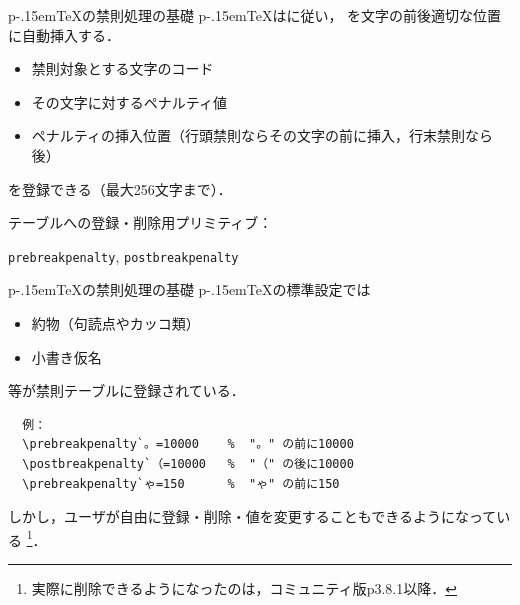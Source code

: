 \documentclass[a5paper,dvipdfmx,14pt]{beamer}
\def\cs#1{\texttt{\char92\nobreak#1}}
\def\pTeX{p\kern-.15em\TeX}
\begin{document}
\begin{frame}{\pTeX の禁則処理の基礎}
\pTeX はに従い，
を文字の前後適切な位置に自動挿入する．
\begin{tcolorbox}[colframe=black!70!green,colback=white!90!blue!90!green,
  coltitle=white,fonttitle=\small\bfseries,
  title=禁則テーブル(KINSOKU table)]\small
\begin{itemize}\small\leftskip-5pt\baselineskip0pt
  \item 禁則対象とする文字のコード
  \item その文字に対するペナルティ値
  \item ペナルティの挿入位置（行頭禁則ならその文字の前に挿入，行末禁則なら後）
\end{itemize}
を登録できる（最大256文字まで）．
\end{tcolorbox}
\pause
テーブルへの登録・削除用プリミティブ：
\begin{center}
  \cs{prebreak{\color{red}penalty}}, \cs{postbreak{\color{red}penalty}}
\end{center}
\end{frame}

\begin{frame}[fragile]{\pTeX の禁則処理の基礎}
\pTeX の標準設定では
\begin{itemize}\small
\item 約物（句読点やカッコ類）
\item 小書き仮名
\end{itemize}
等が禁則テーブルに登録されている．
{\footnotesize
\begin{verbatim}
  例：
  \prebreakpenalty`。=10000    %  "。" の前に10000
  \postbreakpenalty`（=10000   %  "（" の後に10000
  \prebreakpenalty`ゃ=150      %  "ゃ" の前に150
\end{verbatim}
}
しかし，ユーザが自由に登録・削除・値を変更することもできるようになっている\null
\footnote{実際に削除できるようになったのは，コミュニティ版p3.8.1以降．}．
\end{frame}
\end{document}
